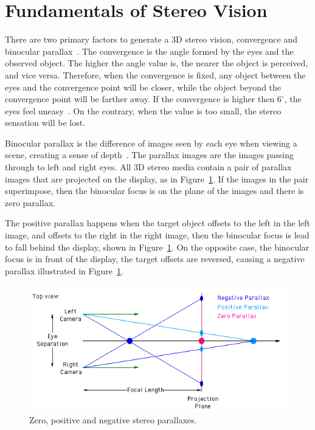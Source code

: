 \section{Fundamentals of Stereo Vision}
\label{sec.stereo}

There are two primary factors to generate a 3D stereo vision, convergence and binocular parallax~\cite{okoshi2012}. The convergence is the angle formed by the eyes and the observed object. The higher the angle value is, the nearer the object is perceived, and vice versa. Therefore, when the convergence is fixed, any object between the eyes and the convergence point will be closer, while the object beyond the convergence point will be farther away. If the convergence is higher then $6^{\circ}$, the eyes feel uneasy~\cite{Fernando2004}. On the contrary, when the value is too small, the stereo sensation will be lost.

Binocular parallax is the difference of images seen by each eye when viewing a scene, creating a sense of depth~\cite{li2012}. The	parallax images are the images passing through to left and right eyes. All 3D stereo media contain a pair of parallax images that are projected on the display, as in Figure~\ref{fig.stereo_parallaxes}. If the images in the pair superimpose, then the binocular focus is on the plane of the images and there is zero parallax.

The positive parallax happens when the target object offsets to the left in the left image, and offsets to the right in the right image, then the binocular focus is lead to fall behind the display, shown in Figure~\ref{fig.stereo_parallaxes}. On the opposite case, the binocular focus is in front of the display, the target offsets are reversed, causing a negative parallax illustrated in Figure~\ref{fig.stereo_parallaxes}.

\begin{figure}
\centering
\includegraphics[width=0.8\linewidth,keepaspectratio=true]{figs/stereo_parallaxes.png}

\caption{Zero, positive and negative stereo parallaxes. }
\label{fig.stereo_parallaxes}
\end{figure}

